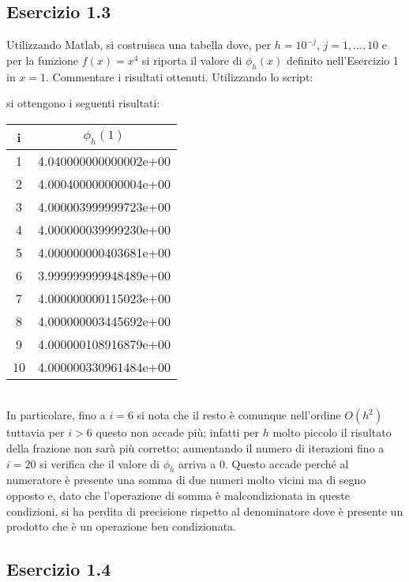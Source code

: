 	\subsection{Esercizio 1.3}
	
Utilizzando Matlab, si costruisca una tabella dove, per $h = 10^{-j}$, $j =1, . . . , 10$ e per la funzione $f(x) = x^{4}$ si riporta il valore di $\phi_h(x)$ definito nell'Esercizio 1 in $x = 1$. Commentare i risultati ottenuti.
\PP
Utilizzando lo script:

si ottengono i seguenti risultati:
\begin{tabular}{ c | c }
i & $\phi_h(1)$ \\
\hline
1  & 4.040000000000002e+00 \\
2  & 4.000400000000004e+00 \\
3  & 4.000003999999723e+00 \\
4  & 4.000000039999230e+00 \\
5  & 4.000000000403681e+00 \\
6  & 3.999999999948489e+00 \\
7  & 4.000000000115023e+00 \\
8  & 4.000000003445692e+00 \\
9  & 4.000000108916879e+00 \\
10 & 4.000000330961484e+00 \\
\end{tabular}\\
In particolare, fino a $i=6$ si nota che il resto è comunque nell'ordine $O(h^2)$ tuttavia per $i>6$ questo non accade più; infatti per $h$ molto piccolo il risultato della frazione non sarà più corretto; aumentando il numero di iterazioni fino a $i=20$ si verifica che il valore di $\phi_h$ arriva a $0$. Questo accade perché al numeratore è presente una somma di due numeri molto vicini ma di segno opposto e, dato che l'operazione di somma è malcondizionata in queste condizioni, si ha perdita di precisione rispetto al denominatore dove è presente un prodotto che è un operazione ben condizionata.

	\subsection{Esercizio 1.4}
	
